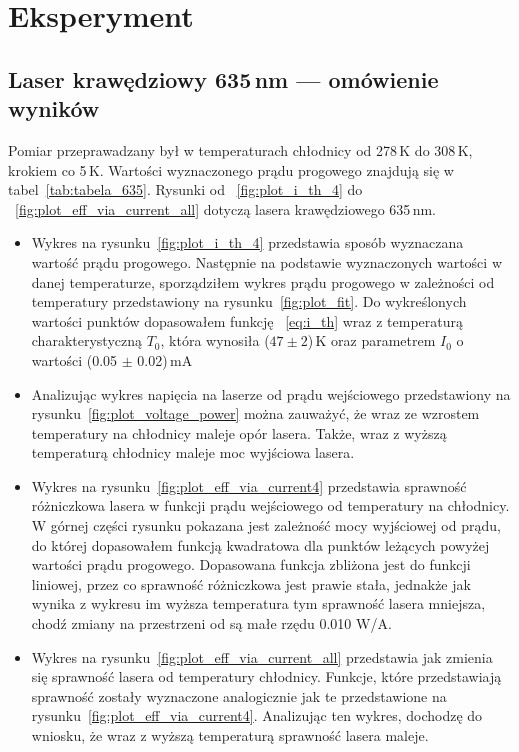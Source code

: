 \section{Eksperyment}
\subsection{Laser krawędziowy 635\,nm --- omówienie wyników}
Pomiar przeprawadzany był w temperaturach chłodnicy od 278\,K do 308\,K, krokiem co 5\,K. Wartości wyznaczonego prądu progowego
znajdują się w tabel~\ref{tab:tabela_635}. Rysunki od ~\ref{fig:plot_i_th_4} do ~\ref{fig:plot_eff_via_current_all} dotyczą lasera
krawędziowego 635\,nm.
\begin{itemize}
\item Wykres na rysunku~\ref{fig:plot_i_th_4} przedstawia sposób wyznaczana wartość prądu progowego. Następnie na podstawie
wyznaczonych wartości w danej temperaturze, sporządziłem wykres prądu progowego w zależności od temperatury
przedstawiony na rysunku~\ref{fig:plot_fit}. Do wykreślonych wartości punktów dopasowałem funkcję ~\ref{eq:i_th} wraz z temperaturą charakterystyczną
$T_0$, która wynosiła ($47 \pm 2$)\,K oraz parametrem $I_0$ o wartości (0.05 $\pm$ 0.02)\,mA
\item Analizując wykres napięcia na laserze od prądu wejściowego przedstawiony na rysunku~\ref{fig:plot_voltage_power}
można zauważyć, że wraz ze wzrostem temperatury na chłodnicy
maleje opór lasera. Także, wraz z wyższą temperaturą chłodnicy maleje moc wyjściowa lasera.
\item Wykres na rysunku~\ref{fig:plot_eff_via_current4} przedstawia sprawność różniczkowa lasera w funkcji prądu wejściowego
od temperatury na chłodnicy. W górnej części rysunku pokazana jest zależność mocy wyjściowej od prądu, do której dopasowałem
funkcją kwadratowa dla punktów leżących powyżej wartości prądu progowego. Dopasowana funkcja zbliżona jest do funkcji liniowej, przez co sprawność różniczkowa jest
prawie stała, jednakże jak wynika z wykresu im wyższa temperatura tym sprawność lasera mniejsza, chodź zmiany na
przestrzeni od są małe rzędu 0.010 W/A.
\item Wykres na rysunku~\ref{fig:plot_eff_via_current_all} przedstawia jak zmienia się sprawność lasera od temperatury chłodnicy.
Funkcje, które przedstawiają sprawność zostały wyznaczone analogicznie jak te przedstawione na rysunku~\ref{fig:plot_eff_via_current4}.
Analizując ten wykres, dochodzę do wniosku, że wraz z wyższą temperaturą sprawność lasera maleje.
\end{itemize}
